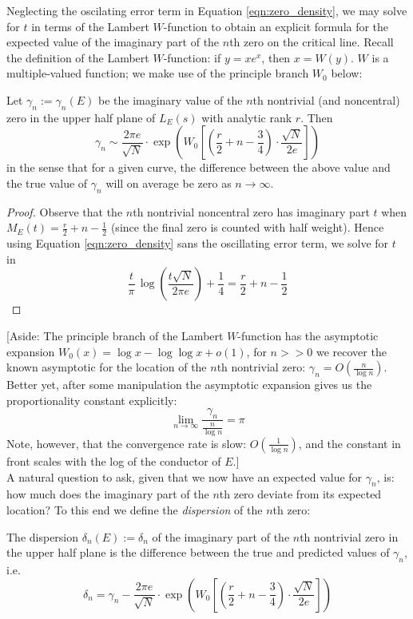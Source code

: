\documentclass[10pt]{article}
\newcommand{\Les}{L_E(s)}
\begin{document}
Neglecting the oscilating error term in Equation \ref{eqn:zero_density}, we may solve for $t$ in terms of the Lambert $W$-function to obtain an explicit formula for the expected value of the imaginary part of the $n$th zero on the critical line. Recall the definition of the Lambert $W$-function: if $y = x e^x$, then $x = W(y)$. $W$ is a multiple-valued function; we make use of the principle branch $W_0$ below:
\begin{corollary}
Let $\gamma_n := \gamma_n(E)$ be the imaginary value of the $n$th nontrivial (and noncentral) zero in the upper half plane of $\Les$ with analytic rank $r$. Then
\begin{equation}\label{approx:gamma_n}
\gamma_n \sim \frac{2\pi e}{\sqrt{N}} \cdot \exp \left(W_0\left[\left(\frac{r}{2} +n - \frac{3}{4}\right)\cdot \frac{\sqrt{N}}{2 e}\right]\right)
\end{equation}
in the sense that for a given curve, the difference between the above value and the true value of $\gamma_n$ will on average be zero as $n \to \infty$.
\end{corollary}
\begin{proof}
Observe that the $n$th nontrivial noncentral zero has imaginary part $t$ when $M_E(t) = \frac{r}{2} + n - \frac{1}{2}$ (since the final zero is counted with half weight). Hence using Equation \ref{eqn:zero_density} sans the oscillating error term, we solve for $t$ in
\begin{equation*}
\frac{t}{\pi} \, \log\left(\frac{t\sqrt{N}}{2\pi e}\right) + \frac{1}{4} = \frac{r}{2} + n - \frac{1}{2}
\end{equation*}
\end{proof}

[Aside: The principle branch of the Lambert $W$-function has the asymptotic expansion $W_0(x) = \log x - \log \log x + o\left(1\right)$, for $n >> 0$ we recover the known asymptotic for the location of the $n$th nontrivial zero: $\gamma_n = O\left(\frac{n}{\log n} \right)$. Better yet, after some manipulation the asymptotic expansion gives us the proportionality constant explicitly:
\begin{equation}
\lim_{n \to \infty} \frac{\gamma_n}{\frac{n}{\log n}} = \pi
\end{equation}
Note, however, that the convergence rate is slow: $O(\frac{1}{\log n})$, and the constant in front scales with the log of the conductor of $E$.] \\

A natural question to ask, given that we now have an expected value for $\gamma_n$, is: how much does the imaginary part of the $n$th zero deviate from its expected location? To this end we define the {\it dispersion} of the $n$th zero:
\begin{definition}
The dispersion $\delta_n(E) := \delta_n$ of the imaginary part of the $n$th nontrivial zero in the upper half plane is the difference between the true and predicted values of $\gamma_n$, i.e.
\begin{equation}
\delta_n = \gamma_n - \frac{2\pi e}{\sqrt{N}} \cdot \exp \left(W_0\left[\left(\frac{r}{2} +n - \frac{3}{4}\right)\cdot \frac{\sqrt{N}}{2 e}\right]\right)
\end{equation}
\end{definition}
\end{document}
